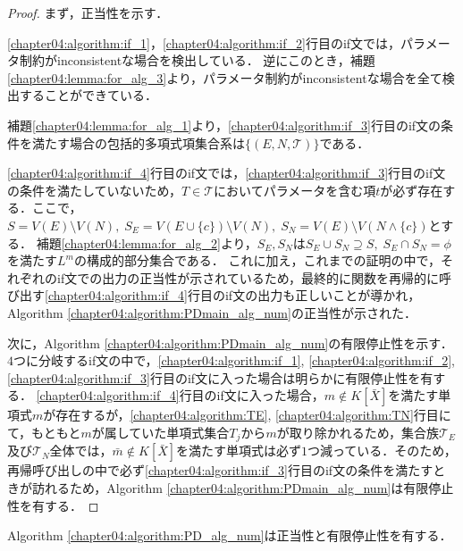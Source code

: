 \begin{proof}
	まず，正当性を示す．
	\par
	\ref{chapter04:algorithm:if_1}，\ref{chapter04:algorithm:if_2}行目のif文では，パラメータ制約がinconsistentな場合を検出している．
	逆にこのとき，補題\ref{chapter04:lemma:for_alg_3}より，パラメータ制約がinconsistentな場合を全て検出することができている．
	\par
	補題\ref{chapter04:lemma:for_alg_1}より，\ref{chapter04:algorithm:if_3}行目のif文の条件を満たす場合の包括的多項式項集合系は$\{(E, N, \mathscr{T})\}$である．
	\par
	\ref{chapter04:algorithm:if_4}行目のif文では，\ref{chapter04:algorithm:if_3}行目のif文の条件を満たしていないため，$T \in \mathscr{T}$においてパラメータを含む項$t$が必ず存在する．ここで，$S = V(E) \setminus V(N), \; S_E = V(E \cup \{ c \}) \setminus V(N), \; S_N = V(E) \setminus V(N \land \{ c \})$とする．
	補題\ref{chapter04:lemma:for_alg_2}より，$S_E, S_N$は$S_E \cup S_N \supseteq S,\; S_E \cap S_N = \phi$を満たす$L^m$の構成的部分集合である．
	これに加え，これまでの証明の中で，それぞれのif文での出力の正当性が示されているため，最終的に関数を再帰的に呼び出す\ref{chapter04:algorithm:if_4}行目のif文の出力も正しいことが導かれ，Algorithm \ref{chapter04:algorithm:PDmain_alg_num}の正当性が示された．
	\par
	次に，Algorithm \ref{chapter04:algorithm:PDmain_alg_num}の有限停止性を示す．
	$4$つに分岐するif文の中で，\ref{chapter04:algorithm:if_1}, \ref{chapter04:algorithm:if_2}, \ref{chapter04:algorithm:if_3}行目のif文に入った場合は明らかに有限停止性を有する．
	\ref{chapter04:algorithm:if_4}行目のif文に入った場合，$m \notin K[\bar{X}]$を満たす単項式$m$が存在するが，\ref{chapter04:algorithm:TE}, \ref{chapter04:algorithm:TN}行目にて，もともと$m$が属していた単項式集合$T_j$から$m$が取り除かれるため，集合族$\mathscr{T}_E$及び$\mathscr{T}_N$全体では，$\bar{m} \notin K[\bar{X}]$を満たす単項式は必ず$1$つ減っている．そのため，再帰呼び出しの中で必ず\ref{chapter04:algorithm:if_3}行目のif文の条件を満たすときが訪れるため，Algorithm \ref{chapter04:algorithm:PDmain_alg_num}は有限停止性を有する．
\end{proof}

\begin{corollary}
	Algorithm \ref{chapter04:algorithm:PD_alg_num}は正当性と有限停止性を有する．
\end{corollary}








